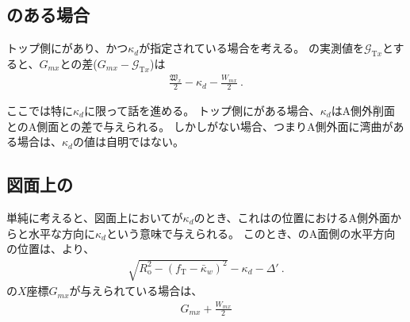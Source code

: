\subsection{\Outcut のある場合}
トップ側に\Outcut があり、かつ\AsideKeywayDepth$\kappa_d$が指定されている場合を考える。
\TopOutcutCenter の実測値を$\mathcal G_{\mathrm Tx}$とすると、\KeywayCenter$G_{mx}$との差($G_{mx}-\mathcal G_{\mathrm Tx}$)は
\begin{align}
  \label{eq:mizocenterAG}
  \frac{\mathfrak W_x}2-\kappa_d-\frac{W_{mx}}2\ .
\end{align}



\clearpage
ここでは特に\AsideKeywayDepth$\kappa_d$に限って話を進める。
トップ側に\Outcut がある場合、$\kappa_d$はA側外削面と\Keyway のA側面との差で与えられる。
しかし\Outcut がない場合、つまりA側外面に湾曲がある場合は、$\kappa_d$の値は自明ではない。


\subsection{図面上の\KeywayDepth}
単純に考えると、図面上において\AsideKeywayDepth が$\kappa_d$のとき、これは\KeywayCenter の位置におけるA側外面から\EndFace と水平な方向に$\kappa_d$という意味で与えられる。
このとき、\Keyway のA面側の水平方向の位置は、より、
\begin{align*}
  \sqrt{R_\mathrm o^2-(f_\mathrm T-\bar\kappa_w)^2}-\kappa_d-\Delta'\ .
\end{align*}
\KeywayCenter の$X$座標$G_{mx}$が与えられている場合は、
\begin{align*}
  G_{mx}+\frac{W_{mx}}2
\end{align*}


